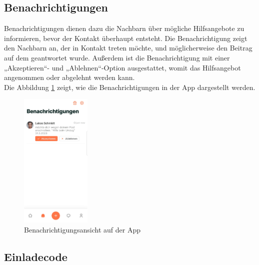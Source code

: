 \subsection{Benachrichtigungen}
Benachrichtigungen dienen dazu die Nachbarn über mögliche Hilfsangebote zu informieren, bevor der Kontakt überhaupt entsteht. Die Benachrichtigung zeigt den Nachbarn an, der in Kontakt treten möchte, und möglicherweise den Beitrag auf dem geantwortet wurde. Außerdem ist die Benachrichtigung mit einer „Akzeptieren“- und „Ablehnen“-Option ausgestattet, womit das Hilfsangebot angenommen oder abgelehnt werden kann.
\\
Die Abbildung \ref{fig:notification-view} zeigt, wie die Benachrichtigungen in der App dargestellt werden.

\begin{figure}[H]
  \centering
  \includegraphics[width=0.3\textwidth]{pics/notification-view.jpg}
  \caption{Benachrichtigungsansicht auf der App}
  \label{fig:notification-view}
\end{figure}


\subsection{Einladecode}

